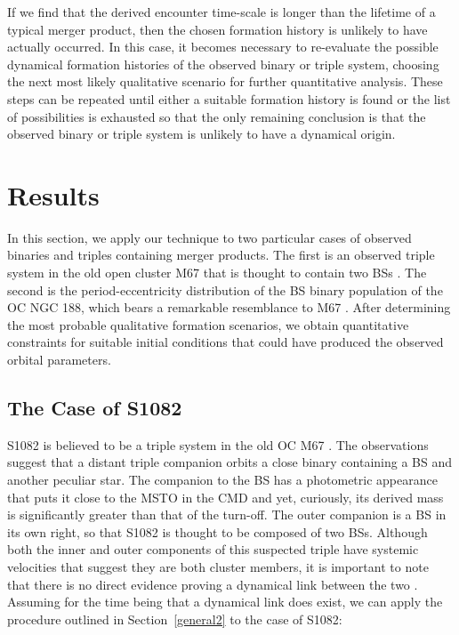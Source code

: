 \begin{enumerate}
If we find that the derived encounter time-scale is 
longer than the lifetime of a typical merger product, then the chosen
formation history is unlikely to have actually occurred.  In this
case, it becomes necessary to 
re-evaluate the possible dynamical formation histories of the observed
binary or triple system, choosing the
next most likely qualitative scenario for further quantitative
analysis.  These
steps can be repeated until either a suitable formation history is
found or the list of possibilities is exhausted so that the only
remaining conclusion is that the observed binary or triple system is
unlikely to have a dynamical origin.

\end{enumerate}

\section{Results} \label{results2}

In this section, we apply our technique to two particular
cases of observed binaries and triples containing merger products.  The 
first is an observed triple system in the old open cluster M67 that is
thought to contain two BSs \citep{vandenberg01,
  sandquist03}.  The second is the 
period-eccentricity distribution of the BS binary
population of the OC NGC 188, which bears a remarkable
resemblance to M67 \citep{mathieu09}.  After determining the most
probable qualitative formation 
scenarios, we obtain quantitative constraints for suitable initial
conditions that could have produced the observed orbital parameters.

\subsection{The Case of S1082} \label{s1082}

S1082 is believed to be a triple system in the old OC M67
\citep{vandenberg01, sandquist03}.  The observations suggest that a
distant triple companion orbits a close binary containing a BS and
another peculiar star.  The companion to the BS has a photometric
appearance that puts it close to the MSTO in the CMD and yet,
curiously, its derived mass is significantly greater than that of the
turn-off.  The outer companion is a BS in its own right, so that S1082
is thought to be composed of two BSs.  Although both the 
inner and outer components of this suspected triple have systemic
velocities that suggest they are both cluster members, it is important
to note that there is no direct evidence proving a dynamical link
between the two \citep{sandquist03}.  Assuming for the time being that
a dynamical link does exist, we can apply the procedure outlined in
Section~\ref{general2} to the case of S1082:

